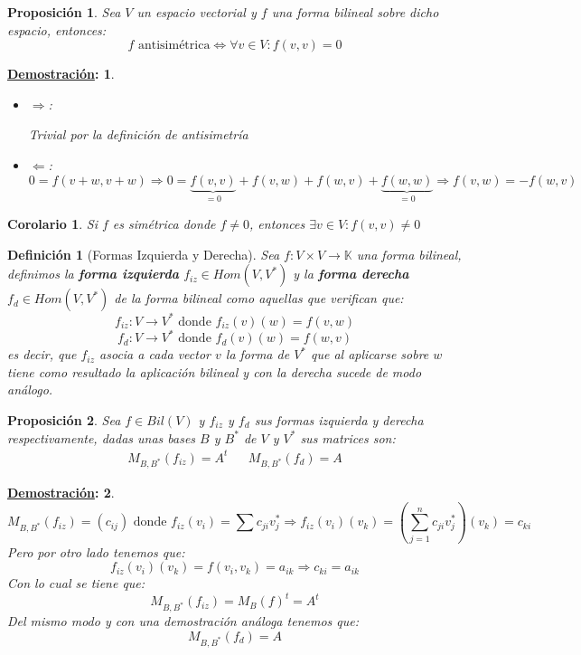 \documentclass[10pt,a4paper,openright]{book}
\theoremstyle{break}
\newtheorem*{defi}{Definición}
\newtheorem*{coro}{Corolario}
\newtheorem*{prop}{Proposición}
\newtheorem*{demo}{\underline{Demostración}:}
\begin{document}
\begin{prop}
Sea $V$ un espacio vectorial y $f$ una forma bilineal sobre dicho espacio, entonces:
$$f \mbox{ antisimétrica} \Leftrightarrow \forall v\in V: f(v,v)=0$$
\end{prop}
\begin{demo}
\begin{itemize}
\item $\Rightarrow$:

Trivial por la definición de antisimetría

\item $\Leftarrow$:
$$0= f(v+w, v+w)\Rightarrow 0= \underbrace{f(v,v)}_{=0}+ f(v,w)+ f(w,v)+ \underbrace{f(w,w)}_{=0}\Rightarrow f(v,w)= - f(w,v)$$
\end{itemize}
\end{demo}

\begin{coro}
Si $f$ es simétrica donde $f\neq 0$, entonces $\exists v\in V: f(v,v)\neq 0$
\end{coro}

\begin{defi}[Formas Izquierda y Derecha]
Sea $f:V\times V \rightarrow \mathbb K$ una forma bilineal, definimos la \textbf{forma izquierda} $f_{iz} \in Hom(V,V^*)$ y la \textbf{forma derecha} $f_{d}\in Hom(V,V^*)$ de la forma bilineal como aquellas que verifican que:
$$f_{iz}: V\rightarrow V^*\mbox{ donde } f_{iz}(v)(w) = f(v,w)$$
$$f_{d}: V\rightarrow V^*\mbox{ donde } f_{d}(v)(w) = f(w,v)$$
es decir, que $f_{iz}$ asocia a cada vector $v$ la forma de $V^*$ que al aplicarse sobre $w$ tiene como resultado la aplicación bilineal y con la derecha sucede de modo análogo.
\end{defi}

\begin{prop}
Sea $f\in Bil(V)$ y $f_{iz}$ y $f_d$ sus formas izquierda y derecha respectivamente, dadas unas bases $B$ y $B^*$ de $V$ y $V^*$ sus matrices son:
\begin{align*}
M_{B,B^*}(f_{iz}) = A^t & & M_{B,B^*}(f_{d}) = A
\end{align*}
\end{prop}
\begin{demo}
$$M_{B,B^*}(f_{iz})= (c_{ij}) \mbox{ donde } f_{iz}(v_i)=\sum c_{ji}v_j^* \Rightarrow f_{iz}(v_i)(v_k)= \left(\sum_{j=1}^{n} c_{ji}v_j^*\right)(v_k) = c_{ki}$$
Pero por otro lado tenemos que:
$$f_{iz}(v_i)(v_k)=f(v_i,v_k) = a_{ik}\Rightarrow c_{ki} = a_{ik}$$
Con lo cual se tiene que:
$$M_{B,B^*}(f_{iz}) = M_B(f)^t = A^t$$
Del mismo modo y con una demostración análoga tenemos que:
$$M_{B,B^*}(f_d) = A$$
\end{demo}
\end{document}
